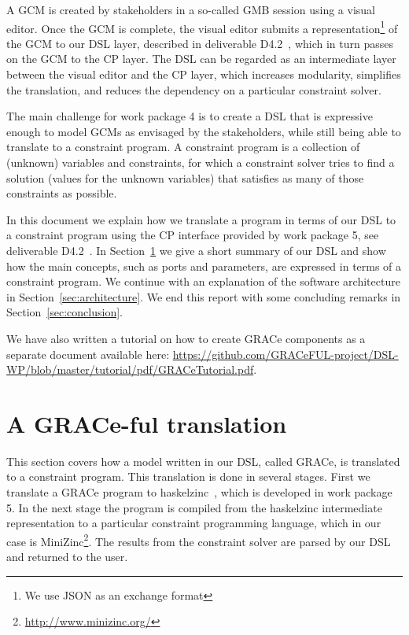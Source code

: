 \documentclass{article}
\begin{document}
A \ac{GCM} is created by stakeholders in a so-called \ac{GMB} session using a
visual editor. Once the \ac{GCM} is complete, the visual editor submits a
representation\footnote{We use \ac{JSON} as an exchange format} of the \ac{GCM}
to our \ac{DSL} layer, described in deliverable D4.2~\cite{D4.2}, which in turn
passes on the \ac{GCM} to the \ac{CP} layer. The \ac{DSL} can be regarded as an
intermediate layer between the visual editor and the \ac{CP} layer, which
increases modularity, simplifies the translation, and reduces the dependency on a
particular constraint solver.

The main challenge for work package 4 is to create a \ac{DSL} that is expressive
enough to model \acp{GCM} as envisaged by the stakeholders, while still being
able to translate to a constraint program. A constraint program is a
collection of (unknown) variables and constraints, for which a constraint solver
tries to find a solution (values for the unknown variables) that satisfies as
many of those constraints as possible.

In this document we explain how we translate a program in terms of our \ac{DSL}
to a constraint program using the \ac{CP} interface provided by work package 5,
see deliverable D4.2~\cite{D4.2}. In Section~\ref{sec:translate} we give a short summary
of our \ac{DSL} and show how the main concepts, such as ports and parameters,
are expressed in terms of a constraint program. We continue with an explanation
of the software architecture in Section~\ref{sec:architecture}. We end this
report with some concluding remarks in Section~\ref{sec:conclusion}.

We have also written a tutorial on how to create GRACe components as a
separate document available here:
\url{https://github.com/GRACeFUL-project/DSL-WP/blob/master/tutorial/pdf/GRACeTutorial.pdf}.

\newpage

\section{A GRACe-ful translation}
\label{sec:translate}


This section covers how a model written in our DSL, called GRACe, is
translated to a constraint program.
%
This translation is done in several stages.
%
First we translate a GRACe program to haskelzinc~\cite{D5.1}, which is
developed in work package 5.
%
In the next stage the program is compiled from the haskelzinc
intermediate representation to a particular constraint programming
language, which in our case is
MiniZinc\footnote{\url{http://www.minizinc.org/}}.
%
The results from the constraint solver are parsed by our \ac{DSL} and
returned to the user.
\end{document}

